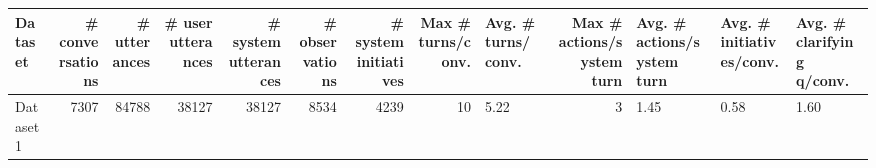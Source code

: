 \begin{tabular}{lrrrrrrrlrlll}
\toprule
Dataset & # conversations & # utterances & # user utterances & # system utterances & # observations & # system initiatives & Max # turns/conv. & Avg. # turns/conv. & Max # actions/system turn & Avg. # actions/system turn & Avg. # initiatives/conv. & Avg. # clarifying q/conv. \\
\midrule
Dataset1 & 7307 & 84788 & 38127 & 38127 & 8534 & 4239 & 10 & 5.22 & 3 & 1.45 & 0.58 & 1.60 \\
\bottomrule
\end{tabular}
